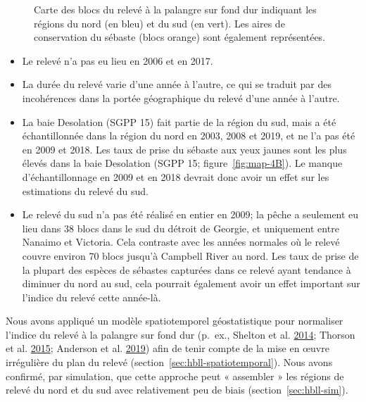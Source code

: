 \documentclass[french,11pt]{book}
\begin{document}
\begin{figure}[htb]

{\centering {} 

}

\caption{Carte des blocs du relevé à la palangre sur fond dur indiquant les régions du nord (en bleu) et du sud (en vert). Les aires de conservation du sébaste (blocs orange) sont également représentées.}\label{fig:map-HBLL-NS}
\end{figure}
\begin{itemize}

\item
  Le relevé n'a pas eu lieu en 2006 et en 2017.
\item
  La durée du relevé varie d'une année à l'autre, ce qui se traduit par des incohérences dans la portée géographique du relevé d'une année à l'autre.
\item
  La baie Desolation (SGPP 15) fait partie de la région du sud, mais a été échantillonnée dans la région du nord en 2003, 2008 et 2019, et ne l'a pas été en 2009 et 2018. Les taux de prise du sébaste aux yeux jaunes sont les plus élevés dans la baie Desolation (SGPP 15; figure~\ref{fig:map-4B}). Le manque d'échantillonnage en 2009 et en 2018 devrait donc avoir un effet sur les estimations du relevé du sud.
\item
  Le relevé du sud n'a pas été réalisé en entier en 2009; la pêche a seulement eu lieu dans 38 blocs dans le sud du détroit de Georgie, et uniquement entre Nanaimo et Victoria. Cela contraste avec les années normales où le relevé couvre environ 70 blocs jusqu'à Campbell River au nord. Les taux de prise de la plupart des espèces de sébastes capturées dans ce relevé ayant tendance à diminuer du nord au sud, cela pourrait également avoir un effet important sur l'indice du relevé cette année-là.
\end{itemize}
Nous avons appliqué un modèle spatiotemporel géostatistique pour normaliser l'indice du relevé à la palangre sur fond dur (p.~ex., Shelton et al. \protect\hyperlink{ref-shelton2014}{2014}; Thorson et al. \protect\hyperlink{ref-thorson2015}{2015}; Anderson et al. \protect\hyperlink{ref-anderson2019synopsis}{2019}) afin de tenir compte de la mise en œuvre irrégulière du plan du relevé (section~\ref{sec:hbll-spatiotemporal}). Nous avons confirmé, par simulation, que cette approche peut « assembler » les régions de relevé du nord et du sud avec relativement peu de biais (section~\ref{sec:hbll-sim}).
\end{document}
